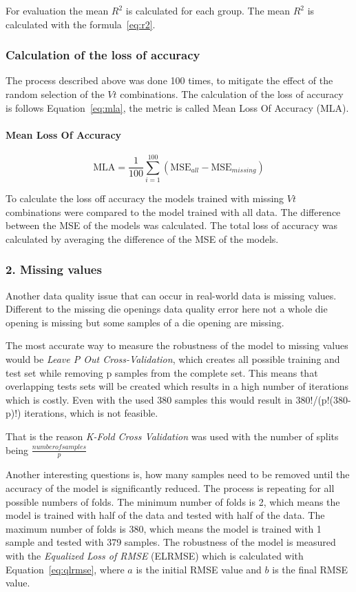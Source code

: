 For evaluation the mean $R^2$ is calculated for each group. The mean $R^2$ is calculated with the formula~\ref{eq:r2}. 

\subsubsection*{Calculation of the loss of accuracy}
The process described above was done 100 times, to mitigate the effect of the random selection of the $Vt$ combinations. 
The calculation of the loss of accuracy is follows Equation~\ref{eq:mla}, the metric is called Mean Loss Of Accuracy (\ac{MLA}).

\paragraph*{Mean Loss Of Accuracy}
\begin{equation}
    \label{eq:mla}
    \text{MLA} = \frac{1}{100} \sum_{i=1}^{100} \left( \text{MSE}_{all} - \text{MSE}_{missing} \right)
\end{equation}

To calculate the loss off accuracy the models trained with missing $Vt$ combinations were compared to the model trained with all data. 
The difference between the \ac{MSE} of the models was calculated. The total loss of accuracy was calculated by averaging the difference of the \ac{MSE} of the models.

\subsubsection*{2. Missing values}
Another data quality issue that can occur in real-world data is missing values.
Different to the missing die openings data quality error here not a whole die opening is missing but some samples of a die opening are missing.  

The most accurate way to measure the robustness of the model to missing values would be \textit{Leave P Out Cross-Validation}, which creates all possible training and test set while removing p samples from the complete set. This means that overlapping tests sets will be created which results in a high number of iterations which is costly.
Even with the used 380 samples this would result in 380!/(p!(380-p)!) iterations, which is not feasible.

That is the reason \textit{K-Fold Cross Validation} was used with the number of splits being $\frac{number of samples}{p}$

Another interesting questions is, how many samples need to be removed until the accuracy of the model is significantly reduced. The process is repeating for all possible numbers of folds. The minimum number of folds is 2, which means the model is trained with half of the data and tested with half of the data. 
The maximum number of folds is 380, which means the model is trained with 1 sample and tested with 379 samples. 
The robustness of the model is measured with the \textit{Equalized Loss of RMSE} (\ac{ELRMSE}) which is calculated with Equation~\ref{eq:qlrmse}, where  $a$ is the initial RMSE value and $b$ is the final RMSE value.

